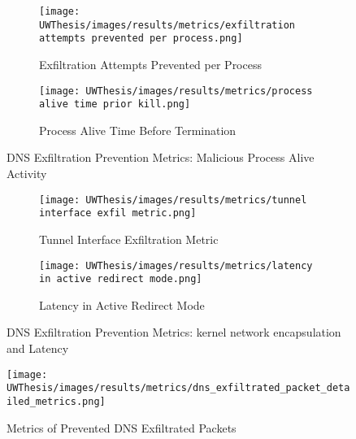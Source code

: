 \documentclass [11pt, proquest] {uwthesis}[2020/02/24]
\begin{document}
\begin{figure}[htbp]
  \centering
  \begin{subfigure}[b]{0.48\textwidth}
    \texttt{[image: UWThesis/images/results/metrics/exfiltration attempts prevented per process.png]}
    \caption{Exfiltration Attempts Prevented per Process}
  \end{subfigure}
  \hfill
  \begin{subfigure}[b]{0.48\textwidth}
    \texttt{[image: UWThesis/images/results/metrics/process alive time prior kill.png]}
    \caption{Process Alive Time Before Termination}
  \end{subfigure}
  \caption{DNS Exfiltration Prevention Metrics: Malicious Process Alive Activity}
  \label{fig:p1}
\end{figure}

\begin{figure}[htbp]
  \centering
  \begin{subfigure}[b]{0.48\textwidth}
    \texttt{[image: UWThesis/images/results/metrics/tunnel interface exfil metric.png]}
    \caption{Tunnel Interface Exfiltration Metric}
  \end{subfigure}
  \hfill
  \begin{subfigure}[b]{0.48\textwidth}
    \texttt{[image: UWThesis/images/results/metrics/latency in active redirect mode.png]}
    \caption{Latency in Active Redirect Mode}
  \end{subfigure}
  \caption{DNS Exfiltration Prevention Metrics: kernel network encapsulation and Latency}
    \label{fig:p2}
\end{figure}

\begin{figure}[H]
    \centering
    \texttt{[image: UWThesis/images/results/metrics/dns\_exfiltrated\_packet\_detailed\_metrics.png]}
    \caption{Metrics of Prevented DNS Exfiltrated Packets}
    \label{fig:dns-exfil-packet-metrics}
\end{figure}

\vspace{-25pt}
\end{document}
